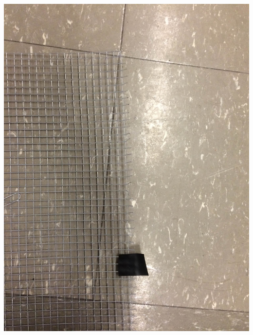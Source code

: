 \documentclass[11pt]{article} %
\begin{document}
\begin{center}
\includegraphics[scale=0.12]{dish/09.jpeg}
\end{center}
\end{document}
